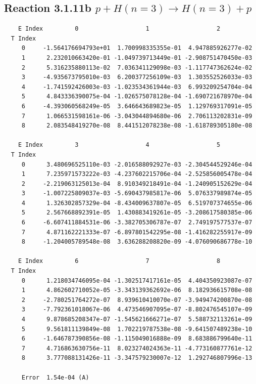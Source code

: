 \documentclass[12pt,dvipdfmx]{article}
\begin{document}
\newpage
\subsection{
Reaction 3.1.11b $  p + H(n=3) \rightarrow H(n=3) + p$}


\begin{small}\begin{verbatim}
    E Index         0                   1                   2
  T Index
     0     -1.564176694793e+01  1.700998335355e-01  4.947885926277e-02
     1      2.232010663420e-01 -1.049739713449e-01 -2.908751470450e-03
     2      5.316235880113e-02  7.036341129098e-03 -1.117747362624e-02
     3     -4.935673795010e-03  6.200377256109e-03  1.303552526033e-03
     4     -1.741592426003e-03 -1.023534361944e-03  6.993209254704e-04
     5      4.843336390075e-04 -1.026575078128e-04 -1.690721678970e-04
     6     -4.393060568249e-05  3.646643689823e-05  1.129769317091e-05
     7      1.066531598161e-06 -3.043044894680e-06  2.706113202831e-09
     8      2.083548419270e-08  8.441512078238e-08 -1.618789305180e-08

    E Index         3                   4                   5
  T Index
     0      3.480696525110e-03 -2.016588092927e-03 -2.304544529246e-04
     1      7.235971573222e-03 -4.237602215706e-04 -2.525856005478e-04
     2     -2.219063125013e-04  8.910349218491e-04 -1.240905152629e-04
     3     -1.007225809037e-03 -5.690437985817e-06  5.076337989874e-05
     4      1.326302857329e-04 -8.434009637807e-05  6.519707374655e-06
     5      2.567668892391e-05  1.430883419261e-05 -3.208617580385e-06
     6     -6.607411884531e-06 -3.382705306787e-07  2.749197577537e-07
     7      4.871162221333e-07 -6.897801542295e-08 -1.416282255917e-09
     8     -1.204005789548e-08  3.636288208820e-09 -4.076090686778e-10

    E Index         6                   7                   8
  T Index
     0      1.218034746095e-04 -1.302517417161e-05  4.404350923087e-07
     1      4.862602710052e-05 -3.343139362692e-06  8.182936615708e-08
     2     -2.780251764272e-07  8.939610410070e-07 -3.949474200870e-08
     3     -7.792361018067e-06  4.473546907095e-07 -8.802476545107e-09
     4      9.878685208347e-07 -1.545621666271e-07  5.588732113261e-09
     5      9.561811139849e-08  1.702219787538e-08 -9.641507489238e-10
     6     -1.646787390856e-08 -1.115049016888e-09  8.683886799640e-11
     7      4.716863630756e-11  8.023274024363e-11 -4.773160877761e-12
     8      3.777088131426e-11 -3.347579230007e-12  1.292746807996e-13

     Error  1.54e-04 (A)
\end{verbatim}\end{small}
\end{document}
